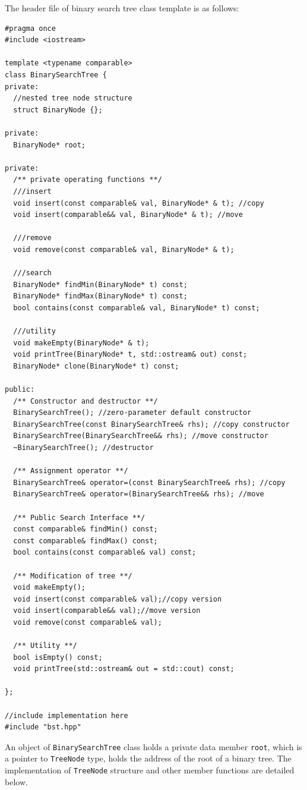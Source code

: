 \documentclass[11pt]{book}
\begin{document}
The header file of binary search tree class template is as follows:
\begin{verbatim}
#pragma once
#include <iostream>

template <typename comparable>
class BinarySearchTree {
private:
  //nested tree node structure
  struct BinaryNode {};

private:
  BinaryNode* root;

private:
  /** private operating functions **/
  ///insert 
  void insert(const comparable& val, BinaryNode* & t); //copy
  void insert(comparable&& val, BinaryNode* & t); //move

  ///remove
  void remove(const comparable& val, BinaryNode* & t);

  ///search 
  BinaryNode* findMin(BinaryNode* t) const;
  BinaryNode* findMax(BinaryNode* t) const;
  bool contains(const comparable& val, BinaryNode* t) const;

  ///utility
  void makeEmpty(BinaryNode* & t);
  void printTree(BinaryNode* t, std::ostream& out) const;
  BinaryNode* clone(BinaryNode* t) const;

public:
  /** Constructor and destructor **/
  BinarySearchTree(); //zero-parameter default constructor
  BinarySearchTree(const BinarySearchTree& rhs); //copy constructor
  BinarySearchTree(BinarySearchTree&& rhs); //move constructor
  ~BinarySearchTree(); //destructor

  /** Assignment operator **/
  BinarySearchTree& operator=(const BinarySearchTree& rhs); //copy
  BinarySearchTree& operator=(BinarySearchTree&& rhs); //move

  /** Public Search Interface **/
  const comparable& findMin() const;
  const comparable& findMax() const;
  bool contains(const comparable& val) const;

  /** Modification of tree **/
  void makeEmpty();
  void insert(const comparable& val);//copy version
  void insert(comparable&& val);//move version
  void remove(const comparable& val);

  /** Utility **/
  bool isEmpty() const;
  void printTree(std::ostream& out = std::cout) const;  

};

//include implementation here 
#include "bst.hpp"
\end{verbatim}

An object of \texttt{BinarySearchTree} class holds a private data member \texttt{root}, which is a pointer to \texttt{TreeNode} type, holds the address of the root of a binary tree. The implementation of \texttt{TreeNode} structure and other member functions are detailed below.
\end{document}
